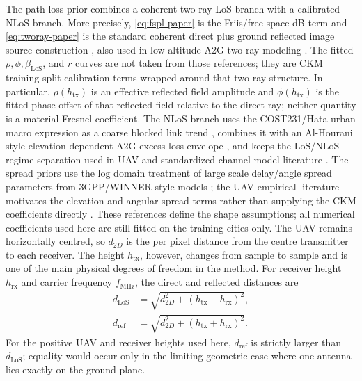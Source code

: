 \documentclass[journal]{IEEEtran}
\begin{document}
The path loss prior combines a coherent two-ray LoS branch with a calibrated
NLoS branch. More precisely, \eqref{eq:fspl-paper} is the Friis/free space
dB term and \eqref{eq:tworay-paper} is the standard coherent direct plus
ground reflected image source construction \cite{rappaport,goldsmith}, also
used in low altitude A2G two-ray modeling \cite{wocc2021}. The fitted
\(\rho,\phi,\beta_{\mathrm{LoS}}\), and \(r\) curves are not taken from those references; they are
CKM training split calibration terms wrapped around that two-ray structure. In
particular, \(\rho(h_{\mathrm{tx}})\) is an effective reflected field
amplitude and \(\phi(h_{\mathrm{tx}})\) is the fitted phase offset of that
reflected field relative to the direct ray; neither quantity is a material
Fresnel coefficient. The
NLoS branch uses the COST231/Hata urban macro expression as a coarse blocked
link trend \cite{cost231}, combines it with an Al-Hourani style
elevation dependent A2G excess loss envelope \cite{alhourani2014}, and keeps
the LoS/NLoS regime separation used in UAV and standardized channel model
literature \cite{khawaja_survey,tr38901}. The spread priors use the
log domain treatment of large scale delay/angle spread parameters from
3GPP/WINNER style models \cite{tr38901,winner2}; the UAV empirical literature
motivates the elevation and angular spread terms rather than supplying the CKM
coefficients directly \cite{cai2019,izydorczyk2019}. These references define
the shape assumptions; all numerical coefficients used here are still fitted on
the training cities only. The UAV remains horizontally centred,
so \(d_{2D}\) is the per pixel distance from the centre transmitter to each
receiver. The height \(h_{\mathrm{tx}}\), however, changes from sample to
sample and is one of the main physical degrees of freedom in the method. For
receiver height \(h_{\mathrm{rx}}\) and carrier frequency \(f_{\mathrm{MHz}}\),
the direct and reflected distances are
\begin{equation}
\begin{aligned}
d_{\mathrm{LoS}}
&=\sqrt{d_{2D}^2+(h_{\mathrm{tx}}-h_{\mathrm{rx}})^2},\\
d_{\mathrm{ref}}
&=\sqrt{d_{2D}^2+(h_{\mathrm{tx}}+h_{\mathrm{rx}})^2}.
\end{aligned}
\label{eq:path-distances}
\end{equation}
For the positive UAV and receiver heights used here, \(d_{\mathrm{ref}}\) is
strictly larger than \(d_{\mathrm{LoS}}\); equality would occur only in the
limiting geometric case where one antenna lies exactly on the ground plane.
\end{document}
